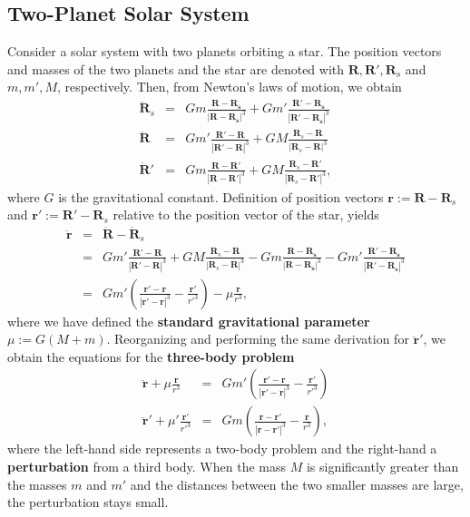 \documentclass [12pt, a4paper] {article}
\newcommand{\vc}[1]
{
	\boldsymbol{#1}
}
\newcommand{\ddvc}[1]
{
	\ddot{\vc #1}
}
\begin{document}
\subsection{Two-Planet Solar System}
Consider a solar system with two planets orbiting a star. 
The position vectors and masses of the two planets and the star are denoted with 
$\vc R, \vc R', \vc R_s$ and $m, m', M$, respectively. 
Then, from Newton's laws of motion, we obtain 
\begin {eqnarray}
    \ddvc R_s 
    &=&
    Gm\frac{\vc R - \vc{R_s}}{|\vc R - \vc{R_s}|^3} 
    + 
    Gm'\frac{\vc R' - \vc{R_s}}{|\vc R' - \vc{R_s}|^3} 
    \\
    \ddvc R 
    &=&
    Gm'\frac{\vc R' - \vc{R}}{|\vc R' - \vc{R}|^3} 
    + 
    GM\frac{\vc R_s - \vc{R}}{|\vc R_s - \vc{R}|^3} 
    \\
    \ddvc R' 
    &=&
    Gm\frac{\vc R - \vc{R'}}{|\vc R - \vc{R'}|^3} 
    + 
    GM\frac{\vc R_s - \vc{R'}}{|\vc R_s - \vc{R'}|^3},
\end {eqnarray}
where $G$ is the gravitational constant.
Definition of position vectors $\vc r := \vc R - \vc R_s$ and $\vc r':= \vc R' - \vc R_s$
relative to the position vector of the star, yields 
\begin {eqnarray}
    \ddvc r 
    &=& 
    \ddvc R - \ddvc R_s
    \\
    &=&
    Gm'\frac{\vc R' - \vc{R}}{|\vc R' - \vc{R}|^3} 
    + 
    GM\frac{\vc R_s - \vc{R}}{|\vc R_s - \vc{R}|^3} 
    -
    Gm\frac{\vc R - \vc{R_s}}{|\vc R - \vc{R_s}|^3} 
    - 
    Gm'\frac{\vc R' - \vc{R_s}}{|\vc R' - \vc{R_s}|^3} 
    \\
    &=&
    Gm'\left(\frac{\vc r' - \vc r}{|\vc r' - \vc r|^3} 
    - 
    \frac{\vc r'}{r'^3} \right)
    - 
    \mu\frac{\vc r}{r^3},
\end {eqnarray}
where we have defined the \textbf{standard gravitational parameter} $\mu := G(M + m)$.
Reorganizing and performing the same derivation for $\ddvc r'$, we obtain the equations 
for the \textbf{three-body problem}
\begin {eqnarray}
    \ddvc r + \mu\frac{\vc r}{r^3} &=& Gm'\left(\frac{\vc r' - \vc r}{|\vc r' - \vc r|^3}
    - 
    \frac{\vc r'}{r'^3} 
    \right)
    \\
    \ddvc r' + \mu'\frac{\vc r'}{r'^3} &=& Gm\left(\frac{\vc r - \vc r'}{|\vc r - \vc r'|^3}
    - 
    \frac{\vc r}{r^3} 
    \right),
\end {eqnarray}
where the left-hand side represents a two-body problem and the right-hand a \textbf{perturbation}
from a third body. When the mass $M$ is significantly greater than the masses $m$ and $m'$ and the 
distances between the two smaller masses are large, the perturbation stays small.
\end{document}

